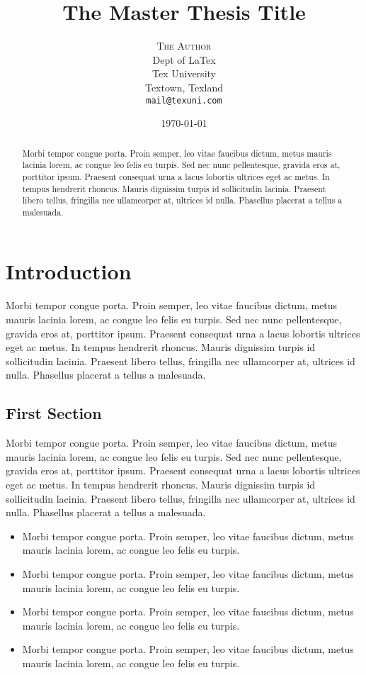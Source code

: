 \documentclass[11pt,titlepage,twoside,openright]{report}
\title{\textbf{The Master Thesis Title}}
\author{\textsc{The Author}\\
	Dept of LaTex\\
	Tex University\\
	Textown, Texland\\
	\texttt{mail@texuni.com}}
\date{\today}
\begin{document}
\maketitle
\tableofcontents
\newpage


\begin{abstract}
Morbi tempor congue porta. Proin semper, leo vitae faucibus dictum, metus mauris lacinia lorem, ac congue leo felis eu turpis. Sed nec nunc pellentesque, gravida eros at, porttitor ipsum. Praesent consequat urna a lacus lobortis ultrices eget ac metus. In tempus hendrerit rhoncus. Mauris dignissim turpis id sollicitudin lacinia. Praesent libero tellus, fringilla nec ullamcorper at, ultrices id nulla. Phasellus placerat a tellus a malesuada.
\end{abstract}

\newpage

\chapter[Chapter Name]{Introduction}

Morbi tempor congue porta. Proin semper, leo vitae faucibus dictum, metus mauris lacinia lorem, ac congue leo felis eu turpis. Sed nec nunc pellentesque, gravida eros at, porttitor ipsum. Praesent consequat urna a lacus lobortis ultrices eget ac metus. In tempus hendrerit rhoncus. Mauris dignissim turpis id sollicitudin lacinia. Praesent libero tellus, fringilla nec ullamcorper at, ultrices id nulla. Phasellus placerat a tellus a malesuada.

\section[Section Name]{First Section}

Morbi tempor congue porta. Proin semper, leo vitae faucibus dictum, metus mauris lacinia lorem, ac congue leo felis eu turpis. Sed nec nunc pellentesque, gravida eros at, porttitor ipsum. Praesent consequat urna a lacus lobortis ultrices eget ac metus. In tempus hendrerit rhoncus. Mauris dignissim turpis id sollicitudin lacinia. Praesent libero tellus, fringilla nec ullamcorper at, ultrices id nulla. Phasellus placerat a tellus a malesuada.

\begin{itemize}
	\item Morbi tempor congue porta. Proin semper, leo vitae faucibus dictum, metus mauris lacinia lorem, ac congue leo felis eu turpis. 
	\item Morbi tempor congue porta. Proin semper, leo vitae faucibus dictum, metus mauris lacinia lorem, ac congue leo felis eu turpis. 
	\item Morbi tempor congue porta. Proin semper, leo vitae faucibus dictum, metus mauris lacinia lorem, ac congue leo felis eu turpis. 
	\item Morbi tempor congue porta. Proin semper, leo vitae faucibus dictum, metus mauris lacinia lorem, ac congue leo felis eu turpis. 
\end{itemize}
\end{document}

